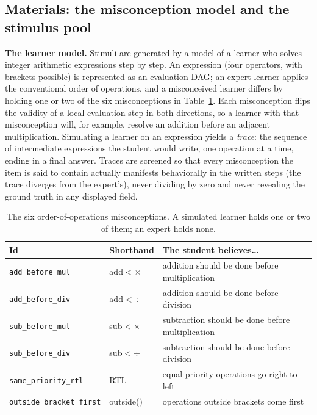 \documentclass[11pt]{article}
\begin{document}
\subsection{Materials: the misconception model and the stimulus pool}\label{sec:materials}

\textbf{The learner model.} Stimuli are generated by a model of a learner who solves integer
arithmetic expressions step by step. An expression (four operators, with brackets possible) is
represented as an evaluation DAG; an expert learner applies the conventional order of
operations, and a misconceived learner differs by holding one or two of the six misconceptions
in Table~\ref{tab:misconceptions}. Each misconception flips the validity of a local evaluation
step in both directions, so a learner with that misconception will, for example, resolve an
addition before an adjacent multiplication. Simulating a learner on an expression yields a
\emph{trace}: the sequence of intermediate expressions the student would write, one operation
at a time, ending in a final answer. Traces are screened so that every misconception the item
is said to contain actually manifests behaviorally in the written steps (the trace diverges
from the expert's), never dividing by zero and never revealing the ground truth in any
displayed field.

\begin{table}[!ht]
\centering
\small
\renewcommand{\arraystretch}{1.25}
\begin{tabular}{@{}llp{}@{}}
\toprule
\textbf{Id} & \textbf{Shorthand} & \textbf{The student believes\ldots}\\
\midrule
\texttt{add\_before\_mul} & add$<\times$ & addition should be done before multiplication\\
\texttt{add\_before\_div} & add$<\div$ & addition should be done before division\\
\texttt{sub\_before\_mul} & sub$<\times$ & subtraction should be done before multiplication\\
\texttt{sub\_before\_div} & sub$<\div$ & subtraction should be done before division\\
\texttt{same\_priority\_rtl} & RTL & equal-priority operations go right to left\\
\texttt{outside\_bracket\_first} & outside() & operations outside brackets come first\\
\bottomrule
\end{tabular}
\caption{The six order-of-operations misconceptions. A simulated learner holds one or two of
them; an expert holds none.}
\label{tab:misconceptions}
\end{table}
\end{document}
